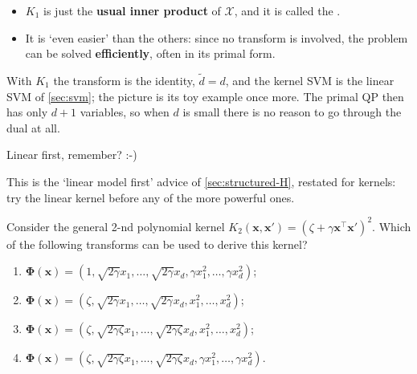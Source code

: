 \begin{center}
    \begin{minipage}[c]{0.62\textwidth}
        \begin{itemize}
            \item \(K_1\) is just the \textbf{usual inner product} of
                \(\mathcal{X}\), and it is called the .
            \item It is `even easier' than the others: since no transform is
                involved, the problem can be solved \textbf{efficiently},
                often in its primal form.
        \end{itemize}
    \end{minipage}%
    \hfill
    \begin{minipage}[c]{0.34\textwidth}
        \centering
    \end{minipage}
\end{center}

With \(K_1\) the transform is the identity, \(\tilde{d} = d\), and the kernel
SVM is the linear SVM of \autoref{sec:svm}; the picture is its toy example
once more. The primal QP then has only \(d + 1\) variables, so when \(d\) is
small there is no reason to go through the dual at all.

\begin{moral}
    Linear first, remember? :-)
\end{moral}

This is the `linear model first' advice of \autoref{sec:structured-H},
restated for kernels: try the linear kernel before any of the more powerful
ones.

\begin{exercise}
    Consider the general 2-nd polynomial kernel \(K_2(\bm{x}, \bm{x}') =
    (\zeta + \gamma \bm{x}^\top \bm{x}')^2\). Which of the following
    transforms can be used to derive this kernel?
    \begin{enumerate}[(1)]
        \item \(\bm{\Phi}(\bm{x}) = (1, \sqrt{2\gamma} x_1, \dots ,
            \sqrt{2\gamma} x_d, \gamma x_1^2, \dots , \gamma x_d^2)\);
        \item \(\bm{\Phi}(\bm{x}) = (\zeta, \sqrt{2\gamma} x_1, \dots ,
            \sqrt{2\gamma} x_d, x_1^2, \dots , x_d^2)\);
        \item \(\bm{\Phi}(\bm{x}) = (\zeta, \sqrt{2\gamma\zeta} x_1, \dots ,
            \sqrt{2\gamma\zeta} x_d, x_1^2, \dots , x_d^2)\);
        \item \(\bm{\Phi}(\bm{x}) = (\zeta, \sqrt{2\gamma\zeta} x_1, \dots ,
            \sqrt{2\gamma\zeta} x_d, \gamma x_1^2, \dots , \gamma x_d^2)\).
    \end{enumerate}
\end{exercise}

